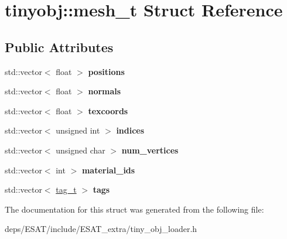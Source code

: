 \hypertarget{structtinyobj_1_1mesh__t}{}\section{tinyobj\+:\+:mesh\+\_\+t Struct Reference}
\label{structtinyobj_1_1mesh__t}
\subsection*{Public Attributes}
\begin{DoxyCompactItemize}
\item 
\mbox{\label{structtinyobj_1_1mesh__t_a3014a27913256384aa283345b69ff2ec}} 
std\+::vector$<$ float $>$ {\bfseries positions}
\item 
\mbox{\label{structtinyobj_1_1mesh__t_a28c2f7eb3114e6ed82a5b7326a4e7a1c}} 
std\+::vector$<$ float $>$ {\bfseries normals}
\item 
\mbox{\label{structtinyobj_1_1mesh__t_a0fc485afc76bcd7e147b22285d7d6575}} 
std\+::vector$<$ float $>$ {\bfseries texcoords}
\item 
\mbox{\label{structtinyobj_1_1mesh__t_aa0a07f40559a650e6917c506d78e298a}} 
std\+::vector$<$ unsigned int $>$ {\bfseries indices}
\item 
\mbox{\label{structtinyobj_1_1mesh__t_aa4858f9a5941c179f76d272b389af954}} 
std\+::vector$<$ unsigned char $>$ {\bfseries num\+\_\+vertices}
\item 
\mbox{\label{structtinyobj_1_1mesh__t_a57b2f12dfa3fd620b25babcd3a09ec6b}} 
std\+::vector$<$ int $>$ {\bfseries material\+\_\+ids}
\item 
\mbox{\label{structtinyobj_1_1mesh__t_a60f51d3802c11e2bf269530e0337fc63}} 
std\+::vector$<$ \mbox{\hyperlink{structtinyobj_1_1tag__t}{tag\+\_\+t}} $>$ {\bfseries tags}
\end{DoxyCompactItemize}


The documentation for this struct was generated from the following file\+:\begin{DoxyCompactItemize}
\item 
deps/\+E\+S\+A\+T/include/\+E\+S\+A\+T\+\_\+extra/tiny\+\_\+obj\+\_\+loader.\+h\end{DoxyCompactItemize}

